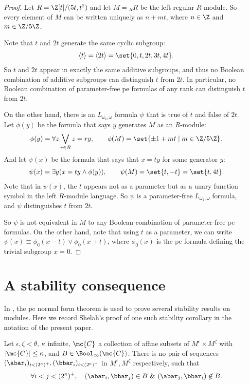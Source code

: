 \documentclass[11pt]{article}
\begin{document}
\begin{proof}
    Let $R = \Z[t] / (5t, t^2)$ and let $M = {}_R R$ be the left regular $R$-module. So every element of $M$ can be written uniquely as $n + mt$, where $n \in \Z$ and $m \in \Z/5\Z$.

    Note that $t$ and $2t$ generate the same cyclic subgroup:
    \[ 
        \langle t \rangle = \langle 2t \rangle = \set{ 0, t, 2t, 3t, 4t }.
    \]
    So $t$ and $2t$ appear in exactly the same additive subgroups, and thus no Boolean combination of additive subgroups can distinguish $t$ from $2t$. In particular, no Boolean combination of parameter-free pe formulas of any rank can distinguish $t$ from $2t$.

    On the other hand, there is an $L_{\omega_1,\omega}$ formula $\psi$ that is true of $t$ and false of $2t$. Let $\phi(y)$ be the formula that says $y$ generates $M$ as an $R$-module:
    \[
        \phi(y) = \forall z \bigvee_{r \in R} z = ry, \qquad \phi(M) = \set{\pm 1 + mt \mid m \in \Z/5\Z }.
    \]
    And let $\psi(x)$ be the formula that says that $x = ty$ for some generator $y$:
    \[
        \psi(x) = \exists y (x = ty \wedge \phi(y)), \qquad \psi(M) = \set{t,-t} = \set{t, 4t}.
    \]
    Note that in $\psi(x)$, the $t$ appears not as a parameter but as a unary function symbol in the left $R$-module language. So $\psi$ is a parameter-free $L_{\omega_1,\omega}$ formula, and $\psi$ distinguishes $t$ from $2t$.

    So $\psi$ is not equivalent in $M$ to any Boolean combination of parameter-free pe formulas. On the other hand, note that using $t$ as a parameter, we can write $\psi(x) \equiv \phi_0(x - t) \vee \phi_0(x + t)$, where $\phi_0(x)$ is the pe formula defining the trivial subgroup $x = 0$.
\end{proof}

\section{A stability consequence}

In \cite{Shelah2012}, the pe normal form theorem is used to prove several stability results on modules. Here we record Shelah's proof of one such stability corollary in the notation of the present paper. 

\begin{lemma}
\label{lem:no-long-orders}
    Let $\epsilon,\zeta < \theta$, $\kappa$ infinite, $\mc{C}$ a collection of affine subsets of $M^\epsilon \times M^\zeta$ with $|\mc{C}| \leq \kappa$, and $B \in \Bool_\infty(\mc{C})$.
    There is no pair of sequences $(\abar_i)_{i < (2^\kappa)^+}, (\bbar_i)_{i < (2^\kappa)^+}$ in $M^\epsilon, M^\zeta$ respectively, such that 
    \[
        \forall i < j < (2^\kappa)^+, \quad (\abar_i, \bbar_j) \in B \ \& \ (\abar_j, \bbar_i) \not \in B.
    \]
\end{lemma}
\end{document}
